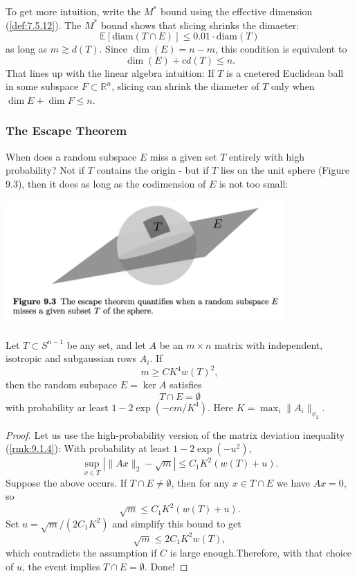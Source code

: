 \begin{remark}
\label{rmk:9.3.3}
To get more intuition, write the $M^*$ bound using the effective dimension (\cref{def:7.5.12}). The $M^*$ bound 
shows that slicing shrinks the dimaeter:
\[ \mathbb{E}\left[ \mathrm{diam}(T \cap E) \right] \leq 0.01 \cdot \mathrm{diam}(T) \]
as long as $m \gtrsim d(T)$. Since $\dim{(E)} = n - m$, this condition is equivalent to 
\[ \dim{(E)} + cd(T) \leq n. \]
That lines up with the linear algebra intuition: If $T$ is a cnetered Euclidean ball in some subspace 
$F \subset \mathbb{R}^n$, slicing can shrink the diameter of $T$ only when $\dim{E} + \dim{F} \leq n$.
\end{remark}


\subsubsection{The Escape Theorem}
When does a random subspace $E$ miss a given set $T$ entirely with high probability? Not if $T$ contains the 
origin - but if $T$ lies on the unit sphere (Figure 9.3), then it does as long as the codimension of $E$ is not 
too small: 

\begin{center}
	\includegraphics[width=0.8\textwidth]{Chapter 9/fig9-3.png}
\end{center}

\begin{theorem}
\label{thm:9.3.4}
Let $T \subset S^{n - 1}$ be any set, and let $A$ be an $m \times n$ matrix with independent, isotropic and 
subgaussian rows $A_i$. If 
\[ m \geq CK^4 w(T)^2, \]
then the random subspace $E = \ker{A}$ satisfies 
\[ T \cap E = \emptyset \]
with probability ar least $1 - 2 \exp{(-cm/K^4)}$. Here $K = \max_{i}\lVert A_i \rVert_{\psi_2}$.
\end{theorem}

\begin{proof}
Let us use the high-probability version of the matrix deviation inequality (\cref{rmk:9.1.4}): With probability 
at least $1 - 2 \exp{(-u^2)}$, 
\[ \sup_{x \in T}\left| \lVert Ax \rVert_{2} - \sqrt{m} \right| \leq C_1K^2(w(T) + u). \]
Suppose the above occurs. If $T \cap E \neq \emptyset$, then for any $x \in T \cap E$ we have $Ax = 0$, so 
\[ \sqrt{m} \leq C_1 K^2 (w(T) + u). \]
Set $u = \sqrt{m}/(2C_1K^2)$ and simplify this bound to get 
\[ \sqrt{m} \leq 2 C_1 K^2 w(T), \]
which contradicts the assumption if $C$ is large enough.Therefore, with that choice of $u$, the event implies 
$T \cap E = \emptyset$. Done!
\end{proof}


